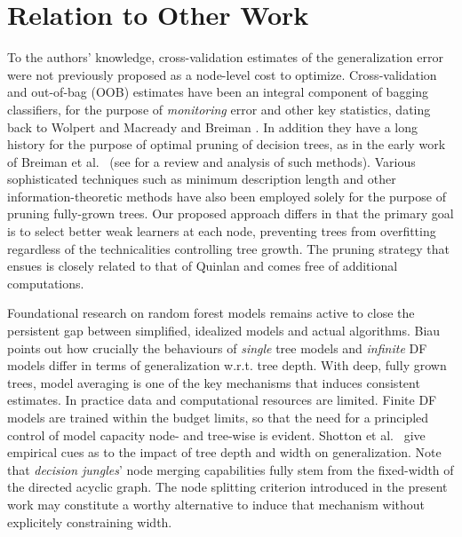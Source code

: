 
\section{Relation to Other Work}
\label{sec: related}

To the authors' knowledge, cross-validation estimates of the generalization error were not previously proposed as a node-level cost to optimize. Cross-validation and out-of-bag (OOB) estimates have been an integral component of bagging classifiers, for the purpose of \textit{monitoring} error and other key statistics, dating back to \eg Wolpert and Macready \cite{wolpert1999efficient} and Breiman \cite{breiman2001random}. In addition they have a long history for the purpose of optimal pruning of decision trees, as in the early work of Breiman et al.~\cite{breiman1984classification} (see \eg \cite{esposito1997comparative} for a review and analysis of such methods). Various sophisticated techniques such as minimum description length \cite{Quinlan:1989,MehtaEtAl:95} and other information-theoretic methods \cite{ForsythCW94} have also been employed solely for the purpose of pruning fully-grown trees. Our proposed approach differs in that the primary goal is to select better weak learners at each node, preventing trees from overfitting regardless of the technicalities controlling tree growth. The pruning strategy that ensues is closely related to that of Quinlan \cite{quinlan1987simplifying} and comes free of additional computations.  

Foundational research on random forest models remains active \cite{scornet2015consistency,scornet2016asymptotics,biau2016random} to close the persistent gap between simplified, idealized models and actual algorithms. Biau \cite{biau2012analysis} points out how crucially the behaviours of \textit{single} tree models and \textit{infinite} DF models differ in terms of generalization w.r.t. tree depth. With deep, fully grown trees, model averaging is one of the key mechanisms that induces consistent estimates. In practice data and computational resources are limited. Finite DF models are trained within the budget limits, so that the need for a principled control of model capacity node- and tree-wise is evident. Shotton et al.~\cite{shotton2013decision} give empirical cues as to the impact of tree depth and width on generalization. Note that \textit{decision jungles}' node merging capabilities fully stem from the fixed-width of the directed acyclic graph. The node splitting criterion introduced in the present work may constitute a worthy alternative to induce that mechanism without explicitely constraining width. 

